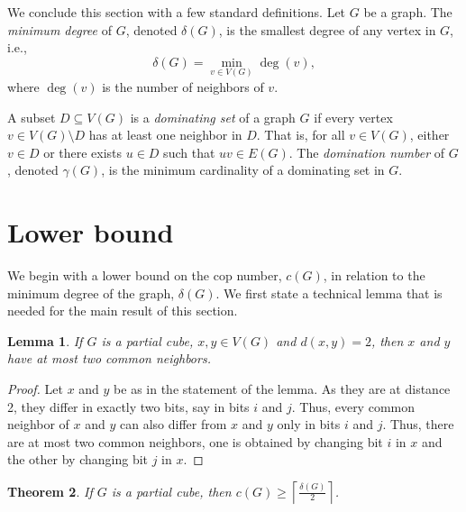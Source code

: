 \documentclass[11pt]{article}
\newtheorem{theorem}{Theorem}[section]
\newtheorem{lemma}[theorem]{Lemma}
\begin{document}
We conclude this section with a few standard definitions. Let $G$ be a graph. The \emph{minimum degree} of $G$, denoted $\delta(G)$, is the smallest degree of any vertex in $G$, i.e.,
\[
\delta(G) = \min_{v \in V(G)} \deg(v),
\]
where $\deg(v)$ is the number of neighbors of $v$.

A subset $D \subseteq V(G)$ is a \emph{dominating set} of a graph $G$ if every vertex $v \in V(G) \setminus D$ has at least one neighbor in $D$. That is, for all $v \in V(G)$, either $v \in D$ or there exists $u \in D$ such that $uv \in E(G)$.
The \emph{domination number} of $G$, denoted $\gamma(G)$, is the minimum cardinality of a dominating set in $G$.

\section{Lower bound}
\label{sec:lower}
We begin with a lower bound on the cop number, $c(G)$, in relation to the minimum degree of the graph, $\delta(G)$. We first state a technical lemma that is needed for the main result of this section.

\begin{lemma}
    \label{lem:at most 2 common neighbors}
    If $G$ is a partial cube, $x, y \in V(G)$ and $d(x,y) = 2$, then $x$ and $y$ have at most two common neighbors.
\end{lemma}

\begin{proof}
    Let $x$ and $y$ be as in the statement of the lemma. As they are at distance 2, they differ in exactly two bits, say in bits $i$ and $j$. Thus, every common neighbor of $x$ and $y$ can also differ from $x$ and $y$ only in bits $i$ and $j$. Thus, there are at most two common neighbors, one is obtained by changing bit $i$ in $x$ and the other by changing bit $j$ in $x$.
\end{proof}

\begin{theorem}
    \label{thm:lower}
    If $G$ is a partial cube, then $c(G) \geq \left \lceil \frac{\delta(G)}{2} \right \rceil$.
\end{theorem}
\end{document}
